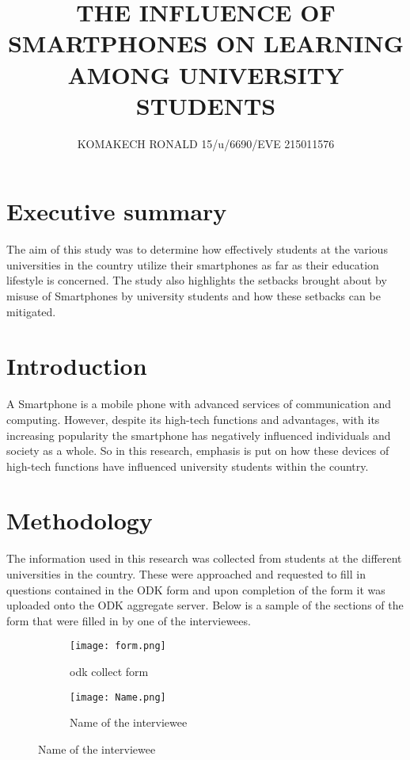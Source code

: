 \documentclass {article}
\date{\displaydate{date}}
\begin{document}
\title{THE INFLUENCE OF SMARTPHONES ON LEARNING AMONG UNIVERSITY STUDENTS}
\author{KOMAKECH RONALD 15/u/6690/EVE 215011576}

\maketitle

\section{Executive summary}

The aim of this study was to determine how effectively students at the various universities in the country utilize their smartphones as far as their education lifestyle is concerned. The study also highlights the setbacks brought about by misuse of Smartphones by university students and how these setbacks can be mitigated.

\section{Introduction}
A Smartphone is a mobile phone with advanced services of communication and computing. However, despite its high-tech functions and advantages, with its increasing popularity the smartphone has negatively influenced individuals and society as a whole. So in this research, emphasis is put on how these devices of high-tech functions have influenced university students within the country.


\section{Methodology}
The information used in this research was collected from students at the different universities in the country. These were approached and requested to fill in questions contained in the ODK form and upon completion of the form it was uploaded onto the ODK aggregate server. Below is a sample of the sections of the form that were filled in by one of the interviewees. 
\newpage
\begin{figure}
  \begin{subfigure}[b]{0.5\textwidth}
    \texttt{[image: form.png]}
    \caption{odk collect form}
    \label{fig:1}
  \end{subfigure}
  \begin{subfigure}[b]{0.5\textwidth}
    \texttt{[image: Name.png]}
    \caption{Name of the interviewee}
    \label{fig:2}
  \end{subfigure}
\end{figure}
\FloatBarrier
\end{document}
